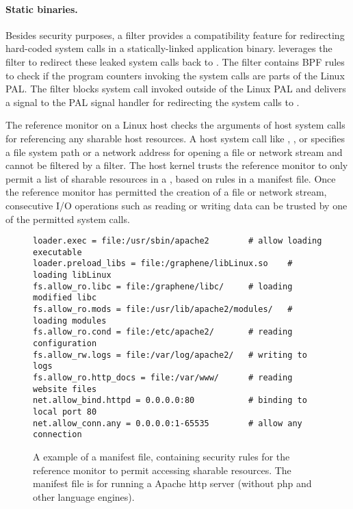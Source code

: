 \paragraph{Static binaries.}
Besides security purposes,
a \seccomp{} filter provides a compatibility feature
for redirecting hard-coded system calls
in a statically-linked application binary.
\graphene{} leverages the \seccomp{} filter to redirect these leaked system calls
back to \thelibos{}. 
The filter contains BPF rules to check if the program counters
invoking the system calls
are parts of the Linux PAL.
The filter blocks system call invoked outside of the Linux PAL
and delivers a  signal
to the PAL signal handler for redirecting the system calls to \thelibos{}.



\label{sec:linux:security:ref-monitor}

The reference monitor on a Linux host
checks the arguments of host system calls for referencing any sharable host resources.
A host system call like , , or 
specifies a file system path or a network address
for opening a file or network stream and cannot be filtered by a \seccomp{} filter.
The host kernel trusts the reference monitor
to only permit
a list of sharable resources in a \picoproc{},
based on
rules in a manifest file.
Once the reference monitor has permitted the creation of a file or network stream,
consecutive I/O operations 
such as reading or writing data can be trusted
by one of the permitted system calls.


\begin{figure}
\centering
\begin{lstlisting}
loader.exec = file:/usr/sbin/apache2        # allow loading executable 
loader.preload_libs = file:/graphene/libLinux.so    # loading libLinux
fs.allow_ro.libc = file:/graphene/libc/     # loading modified libc
fs.allow_ro.mods = file:/usr/lib/apache2/modules/   # loading modules
fs.allow_ro.cond = file:/etc/apache2/       # reading configuration
fs.allow_rw.logs = file:/var/log/apache2/   # writing to logs
fs.allow_ro.http_docs = file:/var/www/      # reading website files
net.allow_bind.httpd = 0.0.0.0:80           # binding to local port 80
net.allow_conn.any = 0.0.0.0:1-65535        # allow any connection
\end{lstlisting}
\caption{A example of a manifest file, containing security rules for the reference monitor to permit accessing sharable resources. The manifest file is for running a Apache http server (without php and other language engines).}
\label{fig:linux:manifest-example}
\end{figure}


